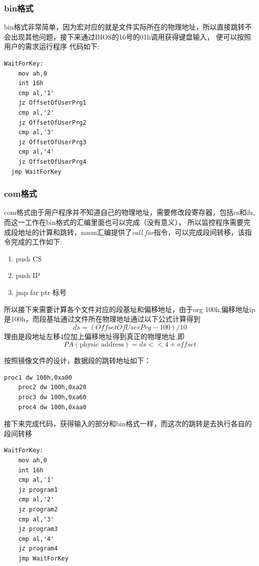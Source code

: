\documentclass[a4paper, 11pt]{article} %
\begin{document}
\subsubsection{bin格式}
bin格式非常简单，因为宏对应的就是文件实际所在的物理地址，所以直接跳转不会出现其他问题，接下来通过BIOS的16号的01h调用获得键盘输入，
便可以按照用户的需求运行程序
代码如下:
\begin{lstlisting}[language={[x86masm]Assembler},label=WaitForKey,caption=获得键盘输入并跳转]
  WaitForKey:
	mov ah,0
	int 16h
	cmp al,'1'
	jz OffsetOfUserPrg1
	cmp al,'2'
	jz OffsetOfUserPrg2
	cmp al,'3'
	jz OffsetOfUserPrg3
	cmp al,'4'
	jz OffsetOfUserPrg4
  jmp WaitForKey
\end{lstlisting}

\subsubsection{com格式}
com格式由于用户程序并不知道自己的物理地址，需要修改段寄存器，包括cs和ds,而这一工作在bin格式的汇编里面也可以完成（没有意义），
所以监控程序需要完成段地址的计算和跳转，nasm汇编提供了\textit{call far}指令，可以完成段间转移，该指令完成的工作如下\cite{callfar}:

\begin{enumerate}
  \item push CS 
  \item push IP 
  \item jmp far ptr 标号
\end{enumerate}
所以接下来需要计算各个文件对应的段基址和偏移地址，由于org 100h,偏移地址ip是100h，而段基址通过文件所在物理地址通过以下公式计算得到
\begin{equation}
  ds=(OffsetOfUserPrg-100)/10
\end{equation}
理由是段地址左移4位加上偏移地址得到真正的物理地址,即
\begin{equation}
  PA(\text{physic address})= ds<<4 + offset
\end{equation}

按照镜像文件的设计，数据段的跳转地址如下：
\begin{lstlisting}[language={[x86masm]Assembler},label=WaitForKey,caption=用户程序对应的跳转地址]
	proc1 dw 100h,0xa00
	proc2 dw 100h,0xa20
	proc3 dw 100h,0xa60
	proc4 dw 100h,0xaa0
\end{lstlisting}

接下来完成代码，获得输入的部分和bin格式一样，而这次的跳转是去执行各自的段间转移
\begin{lstlisting}[language={[x86masm]Assembler},label=WaitForKey,caption=获得键盘输入并跳转]
  WaitForKey:
	mov ah,0
	int 16h
	cmp al,'1'
	jz program1
	cmp al,'2'
	jz program2
	cmp al,'3'
	jz program3
	cmp al,'4'
	jz program4
	jmp WaitForKey
\end{lstlisting}
\end{document}
